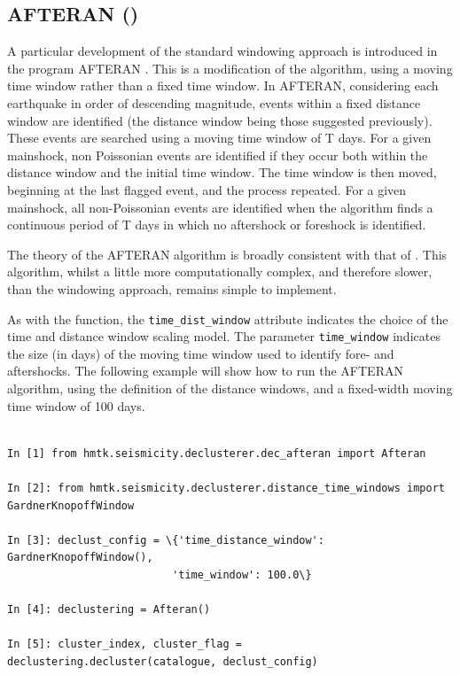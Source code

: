 \subsection{AFTERAN (\cite{Musson1999PSHABalkan})}

A particular development of the standard windowing approach is introduced in the program AFTERAN \cite{Musson1999PSHABalkan}. This is a modification of the \cite{GardnerKnopoff1974} algorithm, using a moving time window rather than a fixed time window. In AFTERAN, considering each earthquake in order of descending magnitude, events within a fixed distance window are identified (the distance window being those suggested previously). These events are searched using a moving time window of T days. For a given mainshock, non Poissonian events are identified if they occur both within the distance window and the initial time window. The time window is then moved, beginning at the last flagged event, and the process repeated. For a given mainshock, all non-Poissonian events are identified when the algorithm finds a continuous period of T days in which no aftershock or foreshock is identified. 

The theory of the AFTERAN algorithm is broadly consistent with that of \cite{GardnerKnopoff1974}. This algorithm, whilst a little more computationally complex, and therefore slower, than the \cite{GardnerKnopoff1974} windowing approach, remains simple to implement. 

As with the \cite{GardnerKnopoff1974} function, the \verb=time_dist_window= attribute indicates the choice of the time and distance window scaling model. The parameter \verb=time_window= indicates the size (in days) of the moving time window used to identify fore- and aftershocks. The following example will show how to run the AFTERAN algorithm, using the  \cite{GardnerKnopoff1974} definition of the distance windows, and a fixed-width moving time window of 100 days.

  
\begin{Verbatim}[frame=single, commandchars=\\\{\}, fontsize=\scriptsize, samepage=true]

In [1] from hmtk.seismicity.declusterer.dec_afteran import Afteran

In [2]: from hmtk.seismicity.declusterer.distance_time_windows import GardnerKnopoffWindow   
 
In [3]: declust_config = \{'time_distance_window': GardnerKnopoffWindow(),
                          'time_window': 100.0\} 

In [4]: declustering = Afteran()

In [5]: cluster_index, cluster_flag = declustering.decluster(catalogue, declust_config)

\end{Verbatim}

